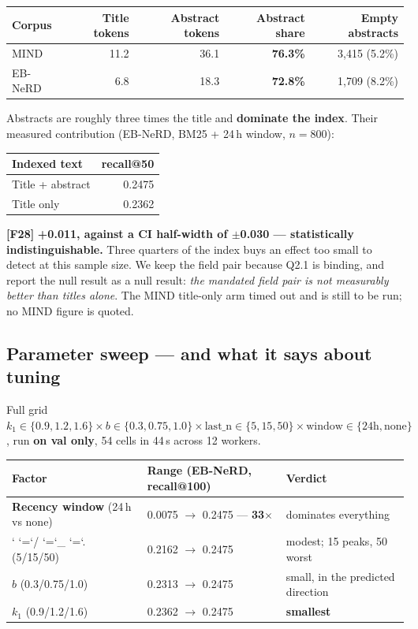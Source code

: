 \documentclass[11pt,a4paper]{article}
\newcommand{\brk}[1]{%
  \begingroup\ttfamily\hyphenchar\font=-1
  \discretionary{}{}{}%
  \expandafter\brkscan\detokenize{#1}\relax\endgroup}
\def\brkscan#1{%
  \ifx#1\relax\else
    \char`#1%
    \ifnum`#1=`/ \penalty0 \fi
    \ifnum`#1=`_ \penalty0 \fi
    \ifnum`#1=`. \penalty0 \fi
    \expandafter\brkscan
  \fi}
\newcommand{\finding}[1]{\textcolor{blue!55!black}{\textbf{[#1]}}}
\begin{document}
\begin{center}
\begin{tabular}{lrrrr}
\toprule
Corpus & Title tokens & Abstract tokens & Abstract share & Empty abstracts \\
\midrule
MIND    & 11.2 & 36.1 & \textbf{76.3\%} & 3,415 (5.2\%) \\
EB-NeRD & 6.8  & 18.3 & \textbf{72.8\%} & 1,709 (8.2\%) \\
\bottomrule
\end{tabular}
\end{center}

Abstracts are roughly three times the title and \textbf{dominate the index}. Their measured
contribution (EB-NeRD, BM25 + 24\,h window, $n=800$):

\begin{center}
\begin{tabular}{lr}
\toprule
Indexed text & recall@50 \\
\midrule
Title + abstract & 0.2475 \\
Title only       & 0.2362 \\
\bottomrule
\end{tabular}
\end{center}

\finding{F28} \textbf{+0.011, against a CI half-width of $\pm$0.030 --- statistically
indistinguishable.} Three quarters of the index buys an effect too small to detect at this sample
size. We keep the field pair because Q2.1 is binding, and report the null result as a null result:
\emph{the mandated field pair is not measurably better than titles alone}. The MIND title-only arm
timed out and is still to be run; no MIND figure is quoted.

\subsection{Parameter sweep --- and what it says about tuning}

Full grid $k_1 \in \{0.9, 1.2, 1.6\} \times b \in \{0.3, 0.75, 1.0\} \times \mathrm{last\_n} \in
\{5, 15, 50\} \times \mathrm{window} \in \{24\mathrm{h}, \mathrm{none}\}$, run \textbf{on val only},
54 cells in 44\,s across 12 workers.

\begin{center}
\begin{tabular}{lll}
\toprule
Factor & Range (EB-NeRD, recall@100) & Verdict \\
\midrule
\textbf{Recency window} (24\,h vs none) & 0.0075 $\rightarrow$ 0.2475 --- \textbf{33$\times$} & dominates everything \\
\brk{last_n} (5/15/50)  & 0.2162 $\rightarrow$ 0.2475 & modest; 15 peaks, 50 worst \\
$b$ (0.3/0.75/1.0)      & 0.2313 $\rightarrow$ 0.2475 & small, in the predicted direction \\
$k_1$ (0.9/1.2/1.6)     & 0.2362 $\rightarrow$ 0.2475 & \textbf{smallest} \\
\bottomrule
\end{tabular}
\end{center}
\end{document}
